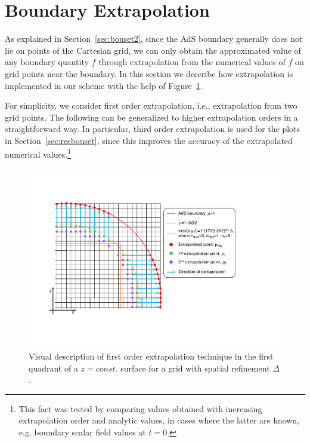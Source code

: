 \documentclass[a4paper,11pt]{article}
\numberwithin{equation}{section}
\begin{document}
\section{Boundary Extrapolation}\label{sec:extrapconvbdy}

As explained in Section~\ref{sec:bouset2}, since the AdS boundary generally does not lie on points of the Cartesian grid, we can only obtain the approximated value of any boundary quantity $f$ through extrapolation from the numerical values of $f$ on grid points near the boundary. In this section we describe how extrapolation is implemented in our scheme with the help of Figure~\ref{fig:lego_circle}. 

For simplicity, we consider first order extrapolation, i.e., extrapolation from two grid points. The following can be generalized to higher extrapolation orders in a straightforward way. In particular, third order extrapolation is used for the plots in Section~\ref{sec:resbouset}, since this improves the accuracy of the extrapolated numerical values.\footnote{This fact was tested by comparing values obtained with increasing extrapolation order and analytic values, in cases where the latter are known, e.g. boundary scalar field values at $t=0$.}

\begin{figure}[t!]
        \centering
        \includegraphics[width=6.1in,clip=true]{plots/lego_circle/Lego_circle_new_noconvergence.pdf}
\parbox{5.0in}{\caption{Visual description of first order extrapolation technique in the first quadrant of a $z=const.$ surface for a grid with spatial refinement $\Delta$.
        }\label{fig:lego_circle}}
\end{figure}
\end{document}
